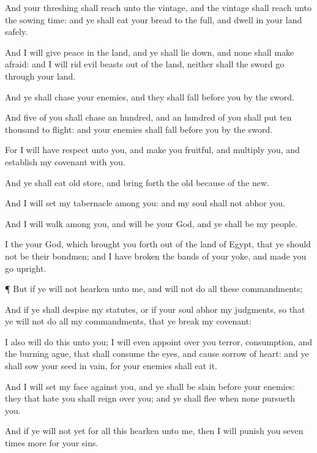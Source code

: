 {And your
threshing shall
reach unto the
vintage, and the
vintage shall
reach unto the sowing
time: and ye shall
eat your
bread to the
full, and
dwell in your
land
safely.

And I will
give
peace in the
land, and ye shall lie
down, and none shall make
{}
afraid: and I will
rid
evil
beasts out of the
land, neither shall the
sword
go through your
land.

And ye shall
chase your
enemies, and they shall
fall
before you by the
sword.

And
five of you shall
chase an
hundred, and an
hundred of you shall put ten
thousand to
flight: and your
enemies shall
fall
before you by the
sword.

For I will have
respect unto you, and make you
fruitful, and
multiply you, and
establish my
covenant with you.

And ye shall
eat old
store, and bring
forth the
old
because of the
new.

And I will
set my
tabernacle
among you: and my
soul shall not
abhor you.

And I will
walk
among you, and will
be your
God, and ye shall
be my
people.

I
{} the
{} your
God, which brought you
forth out of the
land of
Egypt, that ye should not be their
bondmen; and I have
broken the
bands of your
yoke, and made you
go
upright.


\par }{\PP {}¶ But if ye will not
hearken unto me, and will not
do all these
commandments;

And if ye shall
despise my
statutes, or if your
soul
abhor my
judgments, so that ye will not
do all my
commandments,
{} that ye
break my
covenant:

I also will
do this unto you; I will even
appoint over you
terror,
consumption, and the burning
ague, that shall
consume the
eyes, and cause
sorrow of
heart: and ye shall
sow your
seed in
vain, for your
enemies shall
eat it.

And I will
set my
face against you, and ye shall be
slain
before your
enemies: they that
hate you shall
reign over you; and ye shall
flee when none
pursueth you.

And if ye will not
yet for all this
hearken unto me, then I will
punish you seven
times
more for your
sins.

}
